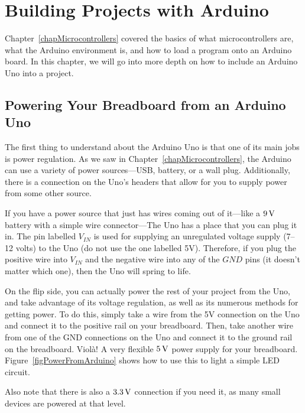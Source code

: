 \chapter{Building Projects with Arduino}
\label{chapArduinoProjects}

Chapter~\ref{chapMicrocontrollers} covered the basics of what microcontrollers are, what the Arduino environment is, and how to load a program onto an Arduino board.
In this chapter, we will go into more depth on how to include an Arduino Uno into a project.

\section{Powering Your Breadboard from an Arduino Uno}

The first thing to understand about the Arduino Uno is that one of its main jobs is power regulation.
As we saw in Chapter~\ref{chapMicrocontrollers}, the Arduino can use a variety of power sources---USB, battery, or a wall plug.
Additionally, there is a connection on the Uno's headers that allow for you to supply power from some other source.

If you have a power source that just has wires coming out of it---like a $9\,\si{\volt}$ battery with a simple wire connector---The Uno has a place that you can plug it in.
The pin labelled $V_{IN}$ is used for supplying an unregulated voltage supply (7--12 volts) to the Uno (do not use the one labelled 5V).
Therefore, if you plug the positive wire into $V_{IN}$ and the negative wire into any of the $GND$ pins (it doesn't matter which one), then the Uno will spring to life.


On the flip side, you can actually power the rest of your project from the Uno, and take advantage of its voltage regulation, as well as its numerous methods for getting power.
To do this, simply take a wire from the 5V connection on the Uno and connect it to the positive rail on your breadboard.
Then, take another wire from one of the GND connections on the Uno and connect it to the ground rail on the breadboard.
Viol\`{a}!  A very flexible $5\,\si{\volt}$ power supply for your breadboard.
Figure~\ref{figPowerFromArduino} shows how to use this to light a simple LED circuit.

Also note that there is also a $3.3\,\si{\volt}$ connection if you need it, as many small devices are powered at that level.

